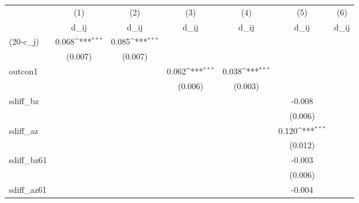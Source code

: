 {
\def\sym#1{\ifmmode^{#1}\else\(^{#1}\)\fi}
\begin{tabular}{l*{6}{c}}
\hline\hline
                    &\multicolumn{1}{c}{(1)}&\multicolumn{1}{c}{(2)}&\multicolumn{1}{c}{(3)}&\multicolumn{1}{c}{(4)}&\multicolumn{1}{c}{(5)}&\multicolumn{1}{c}{(6)}\\
                    &\multicolumn{1}{c}{d\_{ij}}&\multicolumn{1}{c}{d\_{ij}}&\multicolumn{1}{c}{d\_{ij}}&\multicolumn{1}{c}{d\_{ij}}&\multicolumn{1}{c}{d\_{ij}}&\multicolumn{1}{c}{d\_{ij}}\\
\hline
(20-c\_j)            &       0.068\sym{***}&       0.085\sym{***}&                     &                     &                     &                     \\
                    &     (0.007)         &     (0.007)         &                     &                     &                     &                     \\
[1em]
outcon1             &                     &                     &       0.062\sym{***}&       0.038\sym{***}&                     &                     \\
                    &                     &                     &     (0.006)         &     (0.003)         &                     &                     \\
[1em]
sdiff\_bz            &                     &                     &                     &                     &      -0.008         &                     \\
                    &                     &                     &                     &                     &     (0.006)         &                     \\
[1em]
sdiff\_az            &                     &                     &                     &                     &       0.120\sym{***}&                     \\
                    &                     &                     &                     &                     &     (0.012)         &                     \\
[1em]
sdiff\_bz61          &                     &                     &                     &                     &      -0.003         &                     \\
                    &                     &                     &                     &                     &     (0.006)         &                     \\
[1em]
sdiff\_az61          &                     &                     &                     &                     &      -0.004         &                     \\

\end{tabular}}
